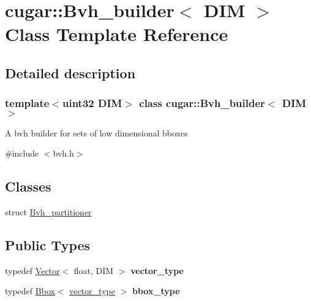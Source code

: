 \hypertarget{classcugar_1_1_bvh__builder}{}\section{cugar\+:\+:Bvh\+\_\+builder$<$ D\+IM $>$ Class Template Reference}
\label{classcugar_1_1_bvh__builder}


\subsection{Detailed description}
\subsubsection*{template$<$uint32 D\+IM$>$\newline
class cugar\+::\+Bvh\+\_\+builder$<$ D\+I\+M $>$}

A bvh builder for sets of low dimensional bboxes 

{\ttfamily \#include $<$bvh.\+h$>$}

\subsection*{Classes}
\begin{DoxyCompactItemize}
\item 
struct \hyperlink{structcugar_1_1_bvh__builder_1_1_bvh__partitioner}{Bvh\+\_\+partitioner}
\end{DoxyCompactItemize}
\subsection*{Public Types}
\begin{DoxyCompactItemize}
\item 
\mbox{\label{classcugar_1_1_bvh__builder_aaca690da5b129a7752e046b1cbdd1fab}} 
typedef \hyperlink{structcugar_1_1_vector}{Vector}$<$ float, D\+IM $>$ {\bfseries vector\+\_\+type}
\item 
\mbox{\label{classcugar_1_1_bvh__builder_a6946aaf55b7ca5a0a35a48aa9a03bb7e}} 
typedef \hyperlink{structcugar_1_1_bbox}{Bbox}$<$ \hyperlink{structcugar_1_1_vector}{vector\+\_\+type} $>$ {\bfseries bbox\+\_\+type}
\end{DoxyCompactItemize}
